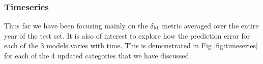 \documentclass[hess, twostagejnl]{copernicus}
\providecommand{\DIFadd}[1]{{\protect\color{blue}\uwave{#1}}} %
\providecommand{\DIFdel}[1]{{\protect\color{red}\sout{#1}}}                      %
\providecommand{\DIFaddbegin}{} %
\providecommand{\DIFaddend}{} %
\providecommand{\DIFdelbegin}{} %
\providecommand{\DIFdelend}{} %
\begin{document}
{{}\DIFaddend 

	\DIFdelbegin %

\DIFdelend \subsubsection{Timeseries}
\DIFdelbegin %

\DIFdelend Thus far we have been focusing mainly on the \DIFdelbegin \DIFdel{$\delta_{\rm M}$ }\DIFdelend \DIFaddbegin \DIFadd{$\delta_{\rm VM}$ }\DIFaddend metric averaged over the entire year of the test set. It is also of interest to explore how the prediction error for each of the 3 models varies with time. This is demonstrated in Fig \ref{fig:timeseries} for each of the 4 updated categories that we have discussed. \newline 

}
\end{document}
